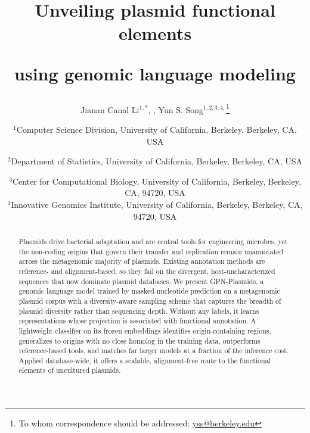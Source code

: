 \documentclass[11pt]{article}
\title{Unveiling plasmid functional elements\par using genomic language modeling}
\author{Jianan Canal Li$^{1,*}$, \todo{co-authors}, Yun S. Song$^{1,2,3,4,}$\footnote{To whom correspondence should be addressed: \url{yss@berkeley.edu}}\\
  \and
  \small$^{1}$Computer Science Division, University of California, Berkeley, Berkeley, CA, USA\and
  \small$^{2}$Department of Statistics, University of California, Berkeley, Berkeley, CA, USA\and
  \small$^{3}$Center for Computational Biology, University of California, Berkeley, Berkeley, CA, 94720, USA\\
  \small$^{4}$Innovative Genomics Institute, University of California, Berkeley, Berkeley, CA, 94720, USA\\
  }
\author{}
\date{}
\theoremstyle{plain}
\newcommand{\model}{GPN-Plasmids\xspace}   %
\begin{document}
\maketitle


%
\begin{abstract}
Plasmids drive bacterial adaptation and are central tools for engineering
microbes, yet the non-coding origins that govern their transfer and
replication remain unannotated across the metagenomic majority of plasmids.
Existing annotation methods are reference- and alignment-based, so they fail
on the divergent, host-uncharacterized sequences that now dominate plasmid
databases. We present \model, a genomic language model trained by
masked-nucleotide prediction on a metagenomic plasmid corpus with a
diversity-aware sampling scheme that captures the breadth of plasmid
diversity rather than sequencing depth. Without any labels, it learns
representations whose projection is associated with functional annotation.
A lightweight
classifier on its frozen embeddings identifies origin-containing regions,
generalizes to origins with no close homolog in the training data,
outperforms reference-based tools, and matches far larger models at a
fraction of the inference cost. Applied database-wide, it offers a scalable,
alignment-free route to the functional elements of uncultured plasmids.
\end{abstract}
\end{document}
